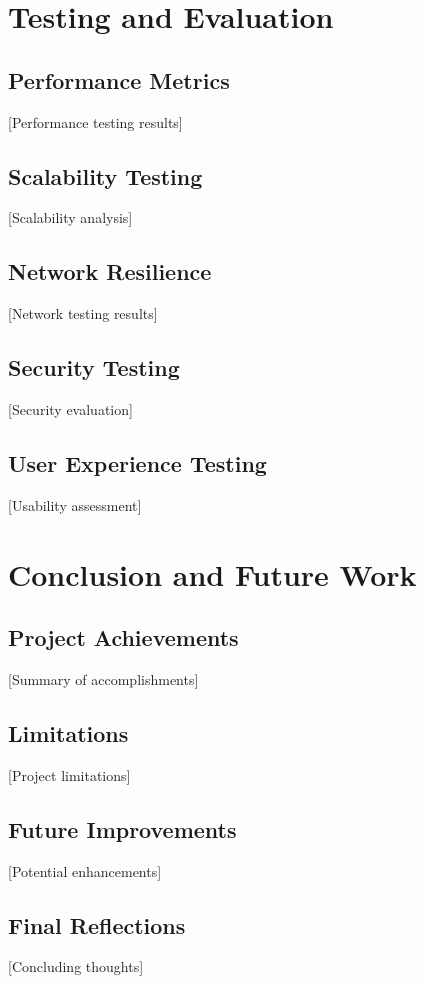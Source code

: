 \chapter{Testing and Evaluation}
\section{Performance Metrics}
 [Performance testing results]

\section{Scalability Testing}
 [Scalability analysis]

\section{Network Resilience}
 [Network testing results]

\section{Security Testing}
 [Security evaluation]

\section{User Experience Testing}
 [Usability assessment]

\chapter{Conclusion and Future Work}
\section{Project Achievements}
 [Summary of accomplishments]

\section{Limitations}
 [Project limitations]

\section{Future Improvements}
 [Potential enhancements]

\section{Final Reflections}
 [Concluding thoughts]

